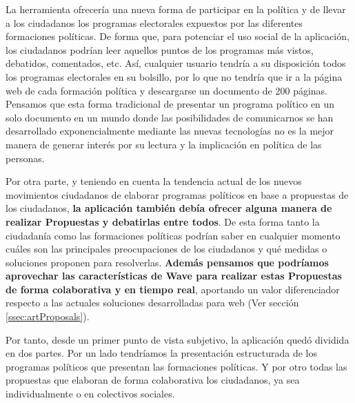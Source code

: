 La herramienta ofrecería una nueva forma de participar en la política y de llevar a los ciudadanos los programas electorales expuestos por las diferentes formaciones políticas. De forma que, para potenciar el uso social de la aplicación, los ciudadanos podrían leer aquellos puntos de los programas más vistos, debatidos, comentados, etc. Así, cualquier usuario tendría a su disposición todos los programas electorales en su bolsillo, por lo que no tendría que ir a la página web de cada formación política y descargarse un documento de 200 páginas. Pensamos que esta forma tradicional de presentar un programa político en un solo documento en un mundo donde las posibilidades de comunicarnos se han desarrollado exponencialmente mediante las nuevas tecnologías no es la mejor manera de generar interés por su lectura y la implicación en política de las personas.

Por otra parte, y teniendo en cuenta la tendencia actual de los nuevos movimientos ciudadanos de elaborar programas políticos en base a propuestas de los ciudadanos, \textbf{la aplicación también debía ofrecer alguna manera de realizar Propuestas y debatirlas entre todos}. De esta forma tanto la ciudadanía como las formaciones políticas podrían saber en cualquier momento cuáles son las principales preocupaciones de los ciudadanos y qué medidas o soluciones proponen para resolverlas. \textbf{Además pensamos que podríamos aprovechar las características de Wave para realizar estas Propuestas de forma colaborativa y en tiempo real}, aportando un valor diferenciador respecto a las actuales soluciones desarrolladas para web (Ver sección \ref{ssec:artProposals}).

Por tanto, desde un primer punto de vista subjetivo, la aplicación quedó dividida en dos partes. Por un lado tendríamos la presentación estructurada de los programas políticos que presentan las formaciones políticas. Y por otro todas las propuestas que elaboran de forma colaborativa los ciudadanos, ya sea individualmente o en colectivos sociales.



